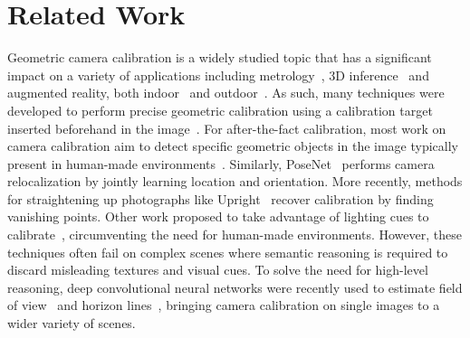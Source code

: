 
\section{Related Work}







Geometric camera calibration is a widely studied topic that has a significant impact on a variety of applications including metrology~\cite{Criminisi2000}, 3D inference~\cite{Criminisi00,Fouhey2013} and augmented reality, both indoor~\cite{hedau-iccv-09,izadinia-cvpr-17} and outdoor~\cite{hoiem-cvpr-06}. As such, many techniques were developed to perform precise geometric calibration using a calibration target inserted beforehand in the image~\cite{Sturm1999,Zhang2002,Heikkila1997,Chen2004}. For after-the-fact calibration, most work on camera calibration aim to detect specific geometric objects in the image typically present in human-made environments~\cite{Rother2000,Melo2013}. Similarly, PoseNet~\cite{kendall-iccv-15} performs camera relocalization by jointly learning location and orientation. More recently, methods for straightening up photographs like Upright~\cite{Lee2014} recover calibration by finding vanishing points. Other work proposed to take advantage of lighting cues to calibrate~\cite{lalonde-ijcv-10,Workman2014}, circumventing the need for human-made environments. However, these techniques often fail on complex scenes where semantic reasoning is required to discard misleading textures and visual cues. To solve the need for high-level reasoning, deep convolutional neural networks were recently used to estimate field of view~\cite{Workman2015a} and horizon lines~\cite{Workman2016}, bringing camera calibration on single images to a wider variety of scenes.

